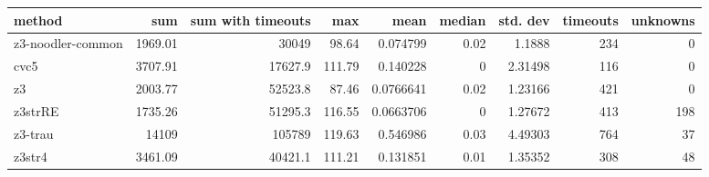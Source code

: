 \begin{tabular}{lrrrrrrrr}
\hline
 method            &      sum &   sum with timeouts &    max &      mean &   median &   std. dev &   timeouts &   unknowns \\
\hline
 z3-noodler-common &  1969.01 &             30049   &  98.64 & 0.074799  &     0.02 &    1.1888  &        234 &          0 \\
 cvc5              &  3707.91 &             17627.9 & 111.79 & 0.140228  &     0    &    2.31498 &        116 &          0 \\
 z3                &  2003.77 &             52523.8 &  87.46 & 0.0766641 &     0.02 &    1.23166 &        421 &          0 \\
 z3strRE           &  1735.26 &             51295.3 & 116.55 & 0.0663706 &     0    &    1.27672 &        413 &        198 \\
 z3-trau           & 14109    &            105789   & 119.63 & 0.546986  &     0.03 &    4.49303 &        764 &         37 \\
 z3str4            &  3461.09 &             40421.1 & 111.21 & 0.131851  &     0.01 &    1.35352 &        308 &         48 \\
\hline
\end{tabular}

